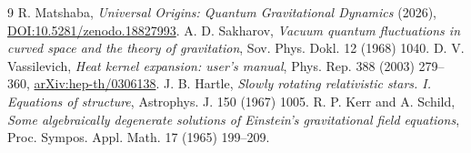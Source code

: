 \documentclass[11pt,a4paper]{article}
\begin{document}
\begin{thebibliography}{9}
 R. Matshaba, \emph{Universal Origins: Quantum Gravitational Dynamics} (2026), \href{https://doi.org/10.5281/zenodo.18827993}{DOI:10.5281/zenodo.18827993}.
 A. D. Sakharov, \emph{Vacuum quantum fluctuations in curved space and the theory of gravitation}, Sov. Phys. Dokl. 12 (1968) 1040.
 D. V. Vassilevich, \emph{Heat kernel expansion: user's manual}, Phys. Rep. 388 (2003) 279--360, \href{https://arxiv.org/abs/hep-th/0306138}{arXiv:hep-th/0306138}.
 J. B. Hartle, \emph{Slowly rotating relativistic stars. I. Equations of structure}, Astrophys. J. 150 (1967) 1005.
 R. P. Kerr and A. Schild, \emph{Some algebraically degenerate solutions of Einstein's gravitational field equations}, Proc. Sympos. Appl. Math. 17 (1965) 199--209.
\end{thebibliography}
\end{document}
